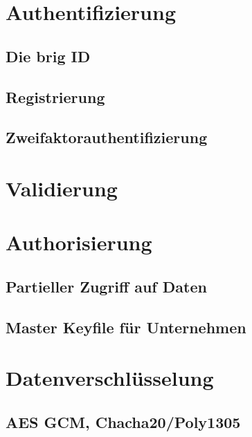 \documentclass[11pt,ngerman,toc=listof,index=totoc]{scrreprt}
\begin{document}
\section{Authentifizierung}\label{authentifizierung}

\subsection{Die brig ID}\label{die-brig-id}

\subsection{Registrierung}\label{registrierung}

\subsection{Zweifaktorauthentifizierung}\label{zweifaktorauthentifizierung}

\section{Validierung}\label{validierung}

\section{Authorisierung}\label{authorisierung}

\subsection{Partieller Zugriff auf
Daten}\label{partieller-zugriff-auf-daten}

\subsection{Master Keyfile für
Unternehmen}\label{master-keyfile-fuxfcr-unternehmen}

\section{Datenverschlüsselung}\label{datenverschluxfcsselung}

\subsection{AES GCM, Chacha20/Poly1305}\label{aes-gcm-chacha20poly1305}
\end{document}
